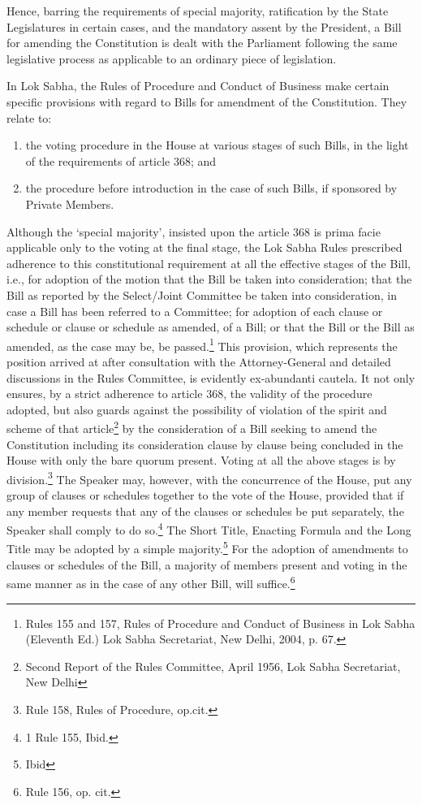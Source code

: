 \begin{multicols}{2}
\noi
Hence, barring the requirements of special majority, ratification by the State Legislatures in
certain cases, and the mandatory assent by the President, a Bill for amending the Constitution
is dealt with the Parliament following the same legislative process as applicable to an ordinary
piece of legislation.

\noi
In Lok Sabha, the Rules of Procedure and Conduct of Business make certain specific
provisions with regard to Bills for amendment of the Constitution. They relate to:

\begin{enumerate}[label=$(\alph*)$]
\item the voting procedure in the House at various stages of such Bills, in the light of the
requirements of article 368; and

\item the procedure before introduction in the case of such Bills, if sponsored by Private
Members.
\end{enumerate}

\noi
Although the ‘special majority’, insisted upon the article 368 is prima facie applicable only to
the voting at the final stage, the Lok Sabha Rules prescribed adherence to this constitutional
requirement at all the effective stages of the Bill, i.e., for adoption of the motion that the Bill
be taken into consideration; that the Bill as reported by the Select/Joint Committee be taken 
into consideration, in case a Bill has been referred to a Committee; for adoption of each clause
or schedule or clause or schedule as amended, of a Bill; or that the Bill or the Bill as amended,
as the case may be, be passed.\footnote{Rules 155 and 157, Rules of Procedure and Conduct of Business in Lok Sabha (Eleventh Ed.) Lok Sabha Secretariat, New Delhi, 2004, p. 67.} This provision, which represents the position arrived at after
consultation with the Attorney-General and detailed discussions in the Rules Committee, is
evidently ex-abundanti cautela. It not only ensures, by a strict adherence to article 368, the
validity of the procedure adopted, but also guards against the possibility of violation of the
spirit and scheme of that article\footnote{Second Report of the Rules Committee, April 1956, Lok Sabha Secretariat, New Delhi} by the consideration of a Bill seeking to amend the Constitution including its consideration clause by clause being concluded in the House with only the bare quorum present. Voting at all the above stages is by division.\footnote{Rule 158, Rules of Procedure, op.cit.} The Speaker
may, however, with the concurrence of the House, put any group of clauses or schedules
together to the vote of the House, provided that if any member requests that any of the clauses
or schedules be put separately, the Speaker shall comply to do so.\footnote{1 Rule 155, Ibid.} The Short Title, Enacting
Formula and the Long Title may be adopted by a simple majority.\footnote{Ibid} For the adoption of
amendments to clauses or schedules of the Bill, a majority of members present and voting in
the same manner as in the case of any other Bill, will suffice.\footnote{Rule 156, op. cit.}


\end{multicols}
